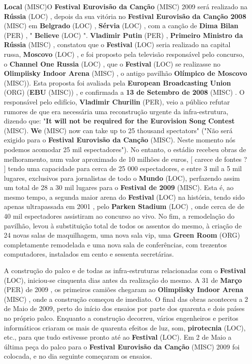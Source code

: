 \documentclass[12pt,a4paper]{article}
\begin{document}
\textbf{Local} (MISC)O \textbf{Festival Eurovisão da Canção} (MISC) 2009 será realizado na \textbf{Rússia} (LOC) , depois da sua vitória no \textbf{Festival Eurovisão da Canção 2008} (MISC) em \textbf{Belgrado} (LOC) , \textbf{Sérvia} (LOC) , com a canção de \textbf{Dima Bilan} (PER) , " \textbf{Believe} (LOC) ". \textbf{Vladimir Putin} (PER) , \textbf{Primeiro Ministro da Rússia} (MISC) , constatou que o \textbf{Festival} (LOC) seria realizado na capital russa, \textbf{Moscovo} (LOC) , e foi proposto pela televisão responsável pelo concurso, o \textbf{Channel One Russia} (LOC) , que o \textbf{Festival} (LOC) se realizasse no \textbf{Olimpiisky Indoor Arena} (MISC) , o antigo pavilhão \textbf{Olímpico de Moscovo} (MISC)). Esta proposta foi avaliada pela \textbf{European Broadcasting Union} (ORG) (\textbf{EBU} (MISC)) , e confirmada a \textbf{13 de Setembro de 2008} (MISC) . O responsável pelo edifício, \textbf{Vladimir Churilin} (PER), veio a público refutar rumores de que era necessária uma reconstrução urgente da infra-estrutura, dizendo que: "\textbf{It will not be required for the Eurovision Song Contest} (MISC). \textbf{We} (MISC) now can take up to 25 thousand spectators" ("Não será exigido para o \textbf{Festival Eurovisão da Canção} (MISC). Neste momento nós podemos acomodar 25 mil espectadores"). No entanto, o estádio recebeu obras de melhoramento, num valor aproximado de 10 milhões de euros, [ carece de fontes ? ] tendo uma capacidade para cerca de 25 000 espectadores, e entre 3 mil a 5 mil lugares, exclusivos para jornalistas de todo o \textbf{Mundo} (LOC), perfazendo assim um total de 28 a 30 mil lugares para o \textbf{Festival de 2009} (MISC). Esta é, ao mesmo tempo, a segunda maior arena do \textbf{Festival} (LOC) na história, tendo sido apenas ultrapassada em 2001 , pelo \textbf{Parken Stadium} (LOC) , onde cerca de de 40 mil espectadores assistiram ao concurso ao vivo. No fim, a remodelação do pavilhão, levou à substituição total de todos os assentos do mesmo, à criação de 24 novas salas de maquilhagem, uma nova sala vip, uma \textbf{Green Room} (ORG) completamente remodelada e uma nova sala de conferências, com trezentos computadores, instalados em cento e sessenta secretárias.

A construção do palco e de todas as infra-estruturas relacionadas com o \textbf{Festival} (LOC), iniciou-se cinquenta dias antes da realização do mesmo. A 31 de \textbf{Março} (PER) de 2009 , os primeiros camiões chegaram ao \textbf{Olimpiisky Indoor Arena} (MISC) , onde a construção começou de imediato. O final das obras aconteceu a 2 de Maio de 2009, perto do início dos ensaios por parte dos quarenta e dois países no próprio palco. Enquanto a construção decorreu, vários engenheiros e peritos informáticos criaram os mais de quarenta efeitos de luz, som, \textbf{pirotecnia} (LOC), etc., para que tudo estivesse pronto até ao \textbf{Festival} (LOC). Em 2 de Maio a última peça do palco para o \textbf{Festival Eurovisão da Canção} (MISC) 2009 foi colocada, e no dia seguinte começaram os ensaios.
\end{document}
